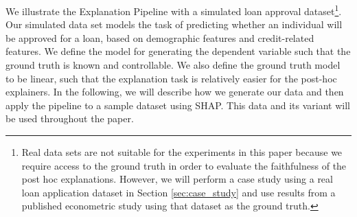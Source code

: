 \documentclass[mnsc,blindrev]{informs3}
\begin{document}
    We illustrate the Explanation Pipeline with a simulated loan approval dataset\footnote{Real data sets are not suitable for the experiments in this paper because we require access to the ground truth in order to evaluate the faithfulness of the post hoc explanations. However, we will perform a case study using a real loan application dataset in Section \ref{sec:case_study} and use results from a published econometric study using that dataset as the ground truth.}. Our simulated data set models the task of predicting whether an individual will be approved for a loan, based on demographic features and credit-related features. We define the model for generating the dependent variable such that the ground truth is known and controllable. We also define the ground truth model to be linear, such that the explanation task is relatively easier for the post-hoc explainers. %
    In the following, we will describe how we generate our data and then apply the pipeline to a sample dataset using SHAP. This data and its variant will be used throughout the paper. %
\end{document}

